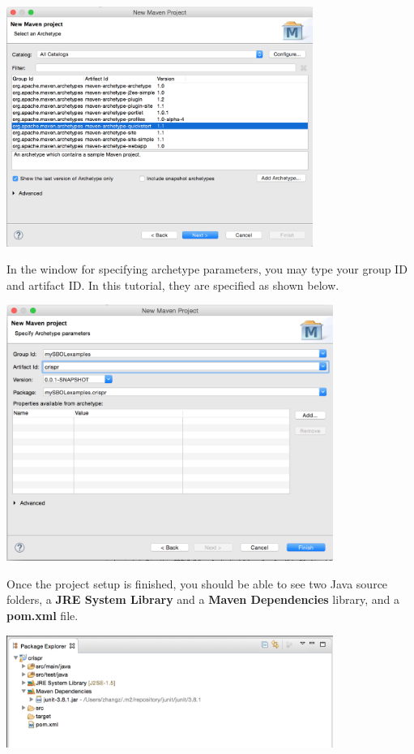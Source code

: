 
\begin{center}
  \includegraphics[width=0.75\textwidth]{figures/createNewMavenProject4}
\end{center}

In the window for specifying archetype parameters, you may type your group ID and artifact ID. In this tutorial, they are specified as shown below. 
\begin{center}
  \includegraphics[width=0.8\textwidth]{figures/createNewMavenProject5}
\end{center}

Once the project setup is finished, you should be able to see two Java source folders, a {\bf JRE System Library} and a {\bf Maven Dependencies} library, and a {\bf pom.xml} file. 
\begin{center}
  \includegraphics[width=0.8\textwidth]{figures/createNewMavenProject6}
\end{center}

